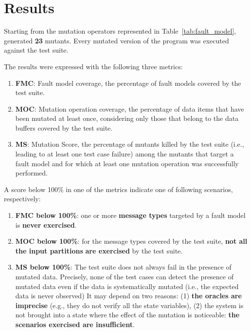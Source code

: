 
\chapter{Results}


Starting from the mutation operators represented in Table~\ref{tab:fault_model}, \DAMA generated \textbf{23} mutants. Every mutated version of the program was executed against the \case test suite.

The results were expressed with the following three metrics:
\begin{enumerate}
\item \textbf{FMC}: Fault model coverage, the percentage of fault models covered by the test suite.
\item \textbf{MOC}: Mutation operation coverage, the percentage of data items that have been mutated at least once, considering only those that belong to the data buffers covered by the test suite.
\item \textbf{MS}: Mutation Score, the percentage of mutants killed by the test suite (i.e., leading to at least one test case failure) among the mutants that target a fault model and for which at least one mutation operation was successfully performed.
\end{enumerate}

A score below 100\% in one of the metrics indicate one of following scenarios, respectively:
\begin{enumerate}
\item \textbf{FMC below 100\%}: one or more \textbf{message types} targeted by a fault model is \textbf{never exercised}.
\item \textbf{MOC below 100\%}: for the message types covered by the test suite, \textbf{not all the input partitions} \textbf{are exercised} by the test suite.
\item \textbf{MS below 100\%}: The test suite does not always fail in the presence of mutated data. Precisely, none of the test cases can detect the presence of mutated data even if the data is systematically mutated (i.e., the expected data is never observed) It may depend on two reasons: (1) \textbf{the oracles are imprecise} (e.g., they do not verify all the state variables), (2) the system is not brought into a state where the effect of the mutation is noticeable: \textbf{the scenarios exercised are insufficient}.
\end{enumerate}

